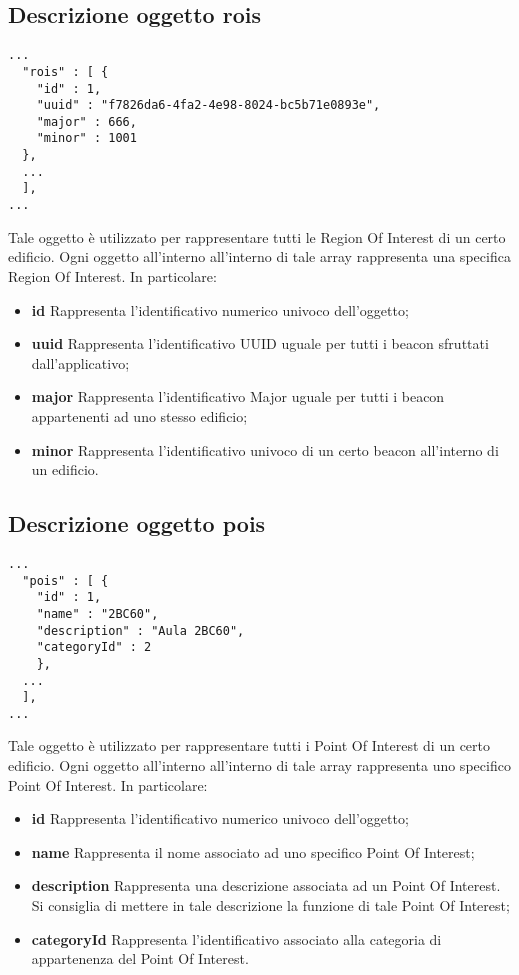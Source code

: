 \documentclass[../ManualeSviluppatore.tex]{subfiles}
\begin{document}
	\subsection{Descrizione oggetto rois}
		\begin{lstlisting}
...
  "rois" : [ {
    "id" : 1,
    "uuid" : "f7826da6-4fa2-4e98-8024-bc5b71e0893e",
    "major" : 666,
    "minor" : 1001
  },
  ...
  ],
...
		\end{lstlisting}
		Tale oggetto è utilizzato per rappresentare tutti le Region Of Interest di un certo edificio. Ogni oggetto all'interno all'interno di tale array rappresenta una specifica Region Of Interest. In particolare:
		\begin{itemize}
			\item \textbf{id} Rappresenta l'identificativo numerico univoco dell'oggetto;
			\item \textbf{uuid} Rappresenta l'identificativo UUID uguale per tutti i beacon sfruttati dall'applicativo;
			\item \textbf{major} Rappresenta l'identificativo Major uguale per tutti i beacon appartenenti ad uno stesso edificio;
			\item \textbf{minor} Rappresenta l'identificativo univoco di un certo beacon all'interno di un edificio.
		\end{itemize}
		\subsection{Descrizione oggetto pois}
		\begin{lstlisting}
...
  "pois" : [ {
	"id" : 1,
	"name" : "2BC60",
	"description" : "Aula 2BC60",
	"categoryId" : 2
    }, 
  ...
  ],
...
		\end{lstlisting}
		Tale oggetto è utilizzato per rappresentare tutti i Point Of Interest di un certo edificio. Ogni oggetto all'interno all'interno di tale array rappresenta uno specifico Point Of Interest. In particolare:
		\begin{itemize}
			\item \textbf{id} Rappresenta l'identificativo numerico univoco dell'oggetto;
			\item \textbf{name} Rappresenta il nome associato ad uno specifico Point Of Interest;
			\item \textbf{description} Rappresenta una descrizione associata ad un Point Of Interest. Si consiglia di mettere in tale descrizione la funzione di tale Point Of Interest;
			\item \textbf{categoryId} Rappresenta l'identificativo associato alla categoria di appartenenza del Point Of Interest.
		\end{itemize}
\end{document}
